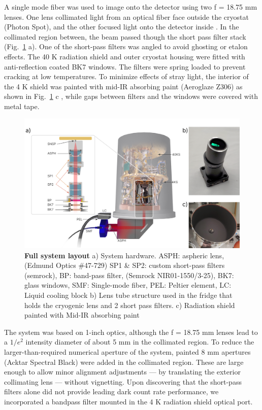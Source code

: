 \documentclass[11pt]{caltech_thesis} %
\begin{document}
A single mode fiber was used to image onto the detector using two f = 18.75 mm lenses. One lens collimated light from an optical fiber face outside the cryostat (Photon Spot), and the other focused light onto the detector inside \autocite{Bellei:16}. In the collimated region between, the beam passed though the short pass filter stack (Fig.~\ref{fig:setup} a). One of the short-pass filters was angled to avoid ghosting or etalon effects. The 40 K radiation shield and outer cryostat housing were fitted with anti-reflection coated BK7 windows. The filters were spring loaded to prevent cracking at low temperatures. To minimize effects of stray light, the interior of the 4 K shield was painted with mid-IR absorbing paint (Aeroglaze Z306) as shown in Fig.~\ref{fig:setup} c \autocite{Persky1999}, while gaps between filters and the windows were covered with metal tape.

\hypertarget{fig:setup}{%
\begin{figure}
\centering
\includegraphics[width=1\textwidth,height=\textheight]{./chapter_02/figs/dcrmin_layout_light.png}
\caption[{Full system layout}]{\textbf{Full system layout} a) System hardware. ASPH: aspheric lens, (Edmund Optics \#47-729)
SP1 \& SP2: custom short-pass filters (semrock), BP: band-pass filter, (Semrock NIR01-1550/3-25), BK7: glass windows, SMF: Single-mode fiber, PEL: Peltier element, LC: Liquid cooling block b) Lens tube structure used in the fridge that holds the cryogenic lens and 2 short pass filters. c) Radiation shield painted with Mid-IR absorbing paint}
\label{fig:setup}
\end{figure}
}

The system was based on 1-inch optics, although the f = 18.75 mm lenses lead to a $1/e^2$ intensity diameter of about 5 mm in the collimated region. To reduce the larger-than-required numerical aperture of the system, painted 8 mm apertures (Acktar Spectral Black) were added in the collimated region. These are large enough to allow minor alignment adjustments --- by translating the exterior collimating lens --- without vignetting. Upon discovering that the short-pass filters alone did not provide leading dark count rate performance, we incorporated a bandpass filter mounted in the 4 K radiation shield optical port.
\end{document}
